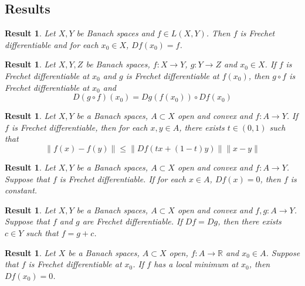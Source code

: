 \documentclass[notheorems]{beamer}
\newtheorem{res}[thm]{Result}
\theoremstyle{definition}
\theoremstyle{definition}
\newcommand{\R}{\mathbb{R}}
\begin{document}
\subsection{Results}
\begin{frame}


\begin{res}
Let $X,Y$ be Banach spaces and $f \in L(X,Y)$. Then $f$ is Frechet differentiable and for each $x_0 \in X$, $Df(x_0) = f$. 
\end{res}
\pause

\begin{res}
Let $X,Y, Z$ be Banach spaces, $f:X \rightarrow Y$, $g :Y \rightarrow Z$ and $x_0 \in X$. If $f$ is Frechet differentiable at $x_0$ and $g$ is Frechet differentiable at $f(x_0)$, then $g \circ f$ is Frechet differentiable at $x_0$ and $$D(g \circ f)(x_0) = Dg(f(x_0)) \circ Df(x_0)$$
\end{res}
\pause

\begin{res}
Let $X, Y$ be a Banach spaces, $A \subset X$ open and convex and $f:A \rightarrow Y$. If $f$ is Frechet differentiable, then for each $x,y \in A$, there exists $t \in (0,1)$ such that $$\|f(x) - f(y)\| \leq \|Df(tx + (1-t)y)\|\|x-y\|$$
\end{res}
\pause

\end{frame}















\begin{frame}
\begin{res}
Let $X, Y$ be a Banach spaces, $A \subset X$ open and convex and $f:A \rightarrow Y$. Suppose that $f$ is Frechet differentiable. If for each $x \in A$, $Df(x) = 0$, then $f$ is constant.
\end{res}
\pause

\begin{res}
Let $X, Y$ be a Banach spaces, $A \subset X$ open and convex and $f,g:A \rightarrow Y$. Suppose that $f$ and $g$ are Frechet differentiable. If $Df = Dg$, then there exists $c \in Y$ such that $f = g+c$.
\end{res}
\pause

\begin{res}
Let $X$ be a Banach spaces, $A \subset X$ open, $f:A \rightarrow \R$ and $x_0 \in A$. Suppose that $f$ is Frechet differentiable at $x_0$. If $f$ has a local minimum at $x_0$, then $Df(x_0) = 0$. 
\end{res}
\end{frame}
\end{document}
